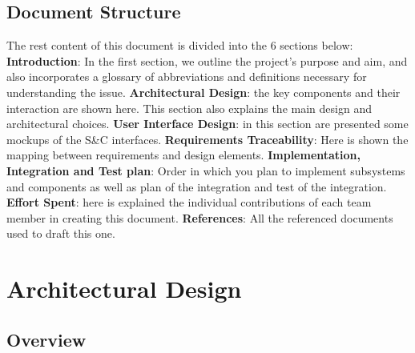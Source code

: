 \documentclass{article}
\begin{document}
\subsection{Document Structure}
The rest content of this document is divided into the 6 sections below:\newline\newline
\textbf{Introduction}: In the first section, we outline the project’s purpose and aim, and also incorporates a glossary of abbreviations and definitions necessary for understanding the issue.\newline\newline
\textbf{Architectural Design}: the key components and their interaction are shown here. This section also explains the main design and architectural choices.\newline\newline
\textbf{User Interface Design}: in this section are presented some mockups of the S\&C interfaces.\newline\newline
\textbf{Requirements Traceability}: Here is shown the mapping between requirements and design elements.  \newline\newline
\textbf{Implementation, Integration and Test plan}: Order in which you plan to implement subsystems and components as well as plan of the integration and test of the integration.\newline\newline
\textbf{Effort Spent}: here is explained the individual contributions of each team member in creating this document.\newline\newline
\textbf{References}: All the referenced documents used to draft this one. 

\section{Architectural Design}

\subsection{Overview}
\end{document}
